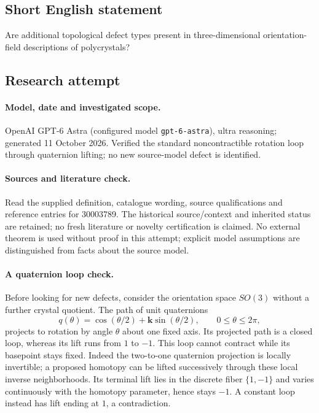 \documentclass[11pt]{article}
\begin{document}
\subsection{Short English statement}
Are additional topological defect types present in three-dimensional orientation-field descriptions of polycrystals?
\subsection{Research attempt}
\paragraph{Model, date and investigated scope.}
OpenAI GPT-6 Astra (configured model \texttt{gpt-6-astra}), ultra reasoning; generated 11 October 2026. Verified the standard noncontractible rotation loop through quaternion lifting; no new source-model defect is identified.

\paragraph{Sources and literature check.}
Read the supplied definition, catalogue wording, source qualifications and reference entries for 30003789. The historical source/context and inherited status are retained; no fresh literature or novelty certification is claimed. No external theorem is used without proof in this attempt; explicit model assumptions are distinguished from facts about the source model.

\paragraph{A quaternion loop check.} Before looking for new defects, consider the orientation space \(SO(3)\) without a further crystal quotient. The path of unit quaternions
\[
 q(\theta)=\cos(\theta/2)+\mathbf k\sin(\theta/2),\qquad0\le\theta\le2\pi,
\]
projects to rotation by angle \(\theta\) about one fixed axis. Its projected path is a closed loop, whereas its lift runs from \(1\) to \(-1\). This loop cannot contract while its basepoint stays fixed. Indeed the two-to-one quaternion projection is locally invertible; a proposed homotopy can be lifted successively through these local inverse neighborhoods. Its terminal lift lies in the discrete fiber \(\{1,-1\}\) and varies continuously with the homotopy parameter, hence stays \(-1\). A constant loop instead has lift ending at \(1\), a contradiction.
\end{document}
